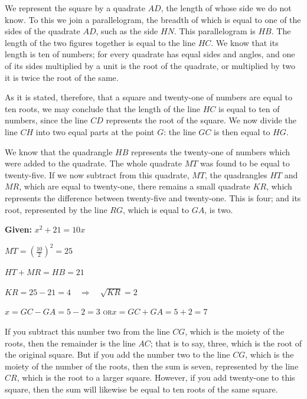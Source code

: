 \documentclass[11pt,a4paper]{book}
\begin{document}
We represent the square by a quadrate $AD$, the length of whose side we do
not know. To this we join a parallelogram, the breadth of which is equal to
one of the sides of the quadrate $AD$, such as the side $HN$. This
parallelogram is $HB$. The length of the two figures together is equal to the
line $HC$. We know that its length is ten of numbers; for every quadrate has
equal sides and angles, and one of its sides multiplied by a unit is the root
of the quadrate, or multiplied by two it is twice the root of the same.

As it is stated, therefore, that a square and twenty-one of numbers are equal
to ten roots, we may conclude that the length of the line $HC$ is equal to
ten of numbers, since the line $CD$ represents the root of the square. We now
divide the line $CH$ into two equal parts at the point $G$: the line $GC$ is
then equal to $HG$.

We know that the quadrangle $HB$ represents the twenty-one of numbers which
were added to the quadrate. The whole quadrate $MT$ was found to be equal to
twenty-five. If we now subtract from this quadrate, $MT$, the quadrangles
$HT$ and $MR$, which are equal to twenty-one, there remains a small quadrate
$KR$, which represents the difference between twenty-five and twenty-one.
This is four; and its root, represented by the line $RG$, which is equal to
$GA$, is two.

\begin{mathbox}[title={\textbf{Geometric Proof of Case V}}]
\begin{center}
\textbf{Given:} $x^2 + 21 = 10x$

\vspace{0.3cm}

$MT = \left(\frac{10}{2}\right)^2 = 25$

$HT + MR = HB = 21$

$KR = 25 - 21 = 4 \quad\Rightarrow\quad \sqrt{KR} = 2$

\vspace{0.3cm}

$x = GC - GA = 5 - 2 = 3$ \quad\textsc{or}\quad $x = GC + GA = 5 + 2 = 7$
\end{center}
\end{mathbox}

If you subtract this number two from the line $CG$, which is the moiety of
the roots, then the remainder is the line $AC$; that is to say, three, which
is the root of the original square. But if you add the number two to the
line $CG$, which is the moiety of the number of the roots, then the sum is
seven, represented by the line $CR$, which is the root to a larger square.
However, if you add twenty-one to this square, then the sum will likewise be
equal to ten roots of the same square.
\end{document}
